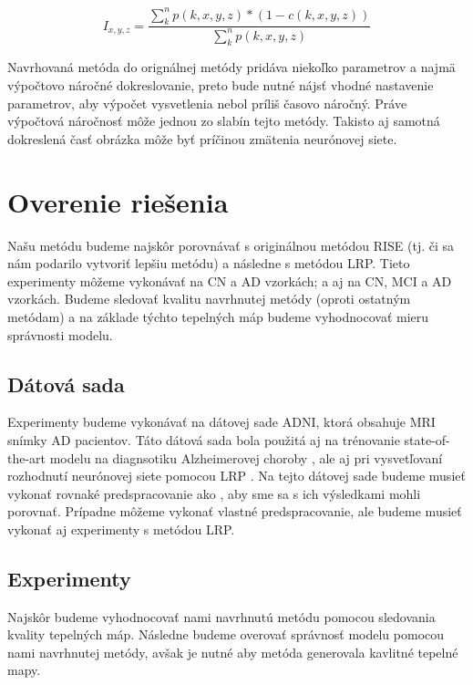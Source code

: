 \begin{equation} 
    I_{x, y, z} = \frac{\sum_{k}^{n} p(k, x, y, z) * (1 - c(k, x, y, z))}{\sum_{k}^{n} p(k, x, y, z)}
    \label{eq:risei_heatmap_1}
\end{equation}

Navrhovaná metóda do orignálnej metódy pridáva niekoľko parametrov a najmä výpočtovo náročné dokreslovanie, preto bude nutné nájsť vhodné nastavenie parametrov, aby výpočet vysvetlenia nebol príliš časovo náročný. Práve výpočtová náročnosť môže jednou zo slabín tejto metódy. Takisto aj samotná dokreslená časť obrázka môže byť príčinou zmätenia neurónovej siete.

\section{Overenie riešenia}

Našu metódu budeme najskôr porovnávať s originálnou metódou RISE (tj. či sa nám podarilo vytvoriť lepšiu metódu) a následne s metódou LRP. Tieto experimenty môžeme vykonávať na CN a AD vzorkách; a aj na CN, MCI a AD vzorkách. Budeme sledovať kvalitu navrhnutej metódy (oproti ostatným metódam) a na základe týchto tepelných máp budeme vyhodnocovať mieru správnosti modelu.

\subsection{Dátová sada} Experimenty budeme vykonávať na dátovej sade ADNI, ktorá obsahuje MRI snímky AD pacientov. Táto dátová sada bola použitá aj na trénovanie state-of-the-art modelu na diagnsotiku Alzheimerovej choroby \cite{esmaeilzadeh2018end}, ale aj pri vysvetľovaní rozhodnutí neurónovej siete pomocou LRP \cite{bohle2019layer}. Na tejto dátovej sade budeme musieť vykonať rovnaké predspracovanie ako \citeauthor*{bohle2019layer}, aby sme sa s ich výsledkami mohli porovnať. Prípadne môžeme vykonať vlastné predspracovanie, ale budeme musieť vykonať aj experimenty s metódou LRP.

\subsection{Experimenty}

Najskôr budeme vyhodnocovať nami navrhnutú metódu pomocou sledovania kvality tepelných máp. Následne budeme overovať správnosť modelu pomocou nami navrhnutej metódy, avšak je nutné aby metóda generovala kavlitné tepelné mapy.

